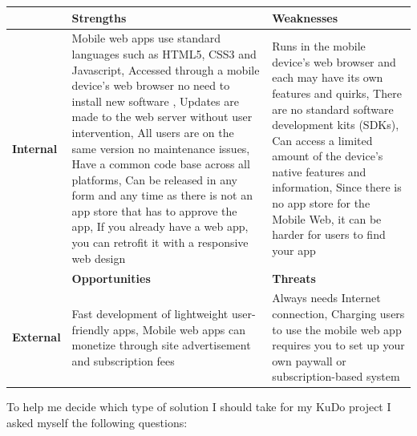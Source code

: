 \documentclass[a4paper,12pt]{book}
\begin{document}
\begin{center}
    \begin{tabular}{ | p{1.7cm} | p{6cm} | p{6cm} |}
    \hline
    & \textbf{Strengths} & \textbf{Weaknesses} \\ \hline
    \textbf{Internal} & 
    Mobile web apps use standard languages such as HTML5, CSS3 and Javascript, %
    Accessed through a mobile device’s web browser no need to install new software ,
    Updates are made to the web server without user intervention,
    All users are on the same version no maintenance issues,
    Have a common code base across all platforms,
    Can be released in any form and any time as there is not an app store that has to approve the app,
    If you already have a web app, you can retrofit it with a responsive web design
    & Runs in the mobile device’s web browser and each may have its own features and quirks, %
    There are no standard software development kits (SDKs), 
    Can access a limited amount of the device’s native features and information,
    Since there is no app store for the Mobile Web, it can be harder for users to find your app\\ \hline
    & \textbf{Opportunities} & \textbf{Threats} \\ \hline
    \textbf{External}  
    & Fast development of lightweight user-friendly apps, %
    Mobile web apps can monetize through site advertisement and subscription fees
    & Always needs Internet connection, %
    Charging users to use the mobile web app requires you to set up your own paywall or subscription-based system\\ \hline
    \end{tabular}
\end{center}

To help me decide which type of solution I should take for my KuDo project I asked myself the following questions:
\end{document}
